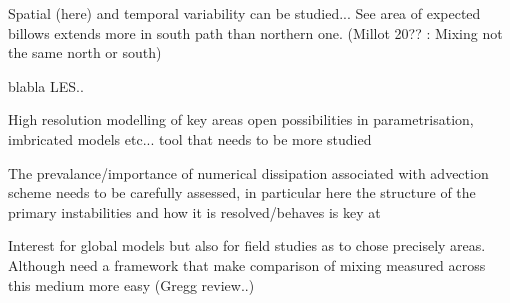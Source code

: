Spatial (here) and temporal variability can be studied... See area of expected billows extends more in south path than northern one. (Millot 20?? : Mixing not the same north or south)



blabla LES..

High resolution modelling of key areas open possibilities in parametrisation, imbricated models etc... tool that needs to be more studied 

The prevalance/importance of numerical dissipation associated with advection scheme needs to be carefully assessed, in particular here the structure of the primary instabilities and how it is resolved/behaves is key at 

Interest for global models but also for field studies as to chose precisely areas. Although need a framework that make comparison of mixing measured across this medium more easy (Gregg review..)



